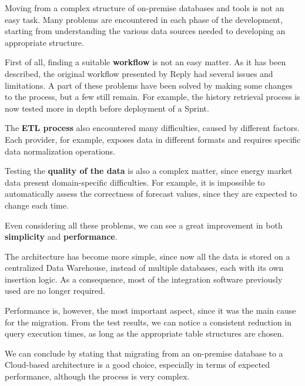 Moving from a complex structure of on-premise databases and tools is not an easy task.
Many problems are encountered in each phase of the development, starting from understanding the various data sources needed to developing an appropriate structure.

First of all, finding a suitable \textbf{workflow} is not an easy matter.
As it has been described, the original workflow presented by Reply had several issues and limitations.
A part of these problems have been solved by making some changes to the process, but a few still remain.
For example, the history retrieval process is now tested more in depth before deployment of a Sprint.

The \textbf{ETL process} also encountered many difficulties, caused by different factors.
Each provider, for example, exposes data in different formats and requires specific data normalization operations.

Testing the \textbf{quality of the data} is also a complex matter, since energy market data present domain-specific difficulties.
For example, it is impossible to automatically assess the correctness of forecast values, since they are expected to change each time.\newline


Even considering all these problems, we can see a great improvement in both \textbf{simplicity} and \textbf{performance}.

The architecture has become more simple, since now all the data is stored on a centralized Data Warehouse, instead of multiple databases, each with its own insertion logic.
As a consequence, most of the integration software previously used are no longer required.

Performance is, however, the most important aspect, since it was the main cause for the migration.
From the test results, we can notice a consistent reduction in query execution times, as long as the appropriate table structures are chosen.

We can conclude by stating that migrating from an on-premise database to a Cloud-based architecture is a good choice, especially in terms of expected performance, although the process is very complex.